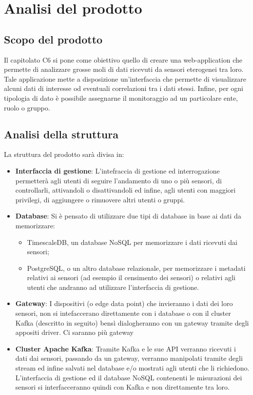 \section{Analisi del prodotto}
	\subsection{Scopo del prodotto}
		Il capitolato C6 si pone come obiettivo quello di creare una web-application che permette di analizzare grosse moli di dati ricevuti da sensori eterogenei tra loro. Tale applicazione mette a disposizione un'interfaccia che permette di visualizzare alcuni dati di interesse od eventuali correlazioni tra i dati stessi. Infine, per ogni tipologia di dato è possibile assegnarne il monitoraggio ad un particolare ente, ruolo o gruppo.
		
	\subsection{Analisi della struttura}
		La struttura del prodotto sarà divisa in:
		\begin{itemize}
			\item \textbf{Interfaccia di gestione}: L'intefraccia di gestione ed interrogazione permetterà agli utenti di seguire l'andamento di uno o più sensori, di controllarli, attivandoli o disattivandoli ed infine, agli utenti con maggiori privilegi, di aggiungere o rimuovere altri utenti o gruppi.
			\item \textbf{Database}: Si è pensato di utilizzare due tipi di database in base ai dati da memorizzare:
			\begin{itemize}
				\item TimescaleDB, un database NoSQL per memorizzare i dati ricevuti dai sensori;
				\item PostgreSQL, o un altro database relazionale, per memorizzare i metadati relativi ai sensori (ad esempio il censimento dei sensori) o relativi agli utenti che andranno ad utilizzare l'interfaccia di gestione.
			\end{itemize}
			\item \textbf{Gateway}: I dispositivi (o edge data point) che invieranno i dati dei loro sensori, non si intefaccerano direttamente con i database o con il cluster Kafka (descritto in seguito) bensì dialogheranno con un gateway tramite degli appositi driver.
			Ci saranno più gateway 


			\item \textbf{Cluster Apache Kafka}: Tramite Kafka e le sue API verranno ricevuti i dati dai sensori, passando da un gateway, verranno manipolati tramite degli stream ed infine salvati nel database e/o mostrati agli utenti che li richiedono. L'interfaccia di gestione ed il database NoSQL contenenti le misurazioni dei sensori si interfacceranno quindi con Kafka e non direttamente tra loro.

		\end{itemize}
